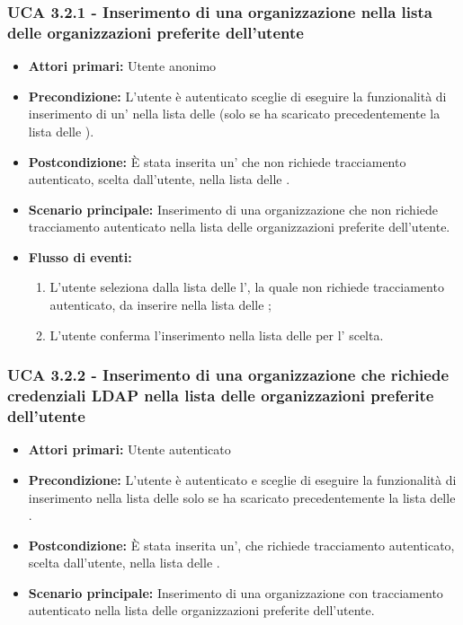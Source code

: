 \subsubsection{UCA 3.2.1 - Inserimento di una organizzazione nella lista delle organizzazioni preferite dell'utente}%
\begin{itemize}
	\item \textbf{Attori primari:} Utente anonimo
	\item \textbf{Precondizione:} L'utente è autenticato sceglie di eseguire la funzionalità di inserimento di un' nella lista delle  (solo se ha scaricato precedentemente la lista delle ).
	\item \textbf{Postcondizione:} È stata inserita un' che non richiede tracciamento autenticato, scelta dall'utente, nella lista delle .
	\item \textbf{Scenario principale:} Inserimento di una organizzazione che non richiede tracciamento autenticato nella lista delle organizzazioni preferite dell'utente.
	\item \textbf{Flusso di eventi:}
	\begin{enumerate}
		\item L'utente seleziona dalla lista delle  l', la quale non richiede tracciamento autenticato, da inserire nella lista delle ;
		\item L'utente conferma l'inserimento nella lista delle  per l' scelta.
	\end{enumerate}
\end{itemize}

\subsubsection{UCA 3.2.2 - Inserimento di una organizzazione che richiede credenziali LDAP nella lista delle organizzazioni preferite dell'utente}%
\begin{itemize}
	\item \textbf{Attori primari:} Utente autenticato
	\item \textbf{Precondizione:} L'utente è autenticato e sceglie di eseguire la funzionalità di inserimento nella lista delle  solo se ha scaricato precedentemente la lista delle .
	\item \textbf{Postcondizione:} È stata inserita un', che richiede tracciamento autenticato, scelta dall'utente, nella lista delle .
	\item \textbf{Scenario principale:} Inserimento di una organizzazione con tracciamento autenticato nella lista delle organizzazioni preferite dell'utente.
\end{itemize}

